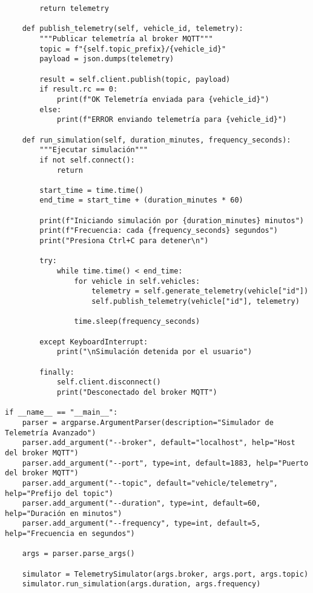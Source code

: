 \begin{verbatim}
        return telemetry
    
    def publish_telemetry(self, vehicle_id, telemetry):
        """Publicar telemetría al broker MQTT"""
        topic = f"{self.topic_prefix}/{vehicle_id}"
        payload = json.dumps(telemetry)
        
        result = self.client.publish(topic, payload)
        if result.rc == 0:
            print(f"OK Telemetría enviada para {vehicle_id}")
        else:
            print(f"ERROR enviando telemetría para {vehicle_id}")
    
    def run_simulation(self, duration_minutes, frequency_seconds):
        """Ejecutar simulación"""
        if not self.connect():
            return
        
        start_time = time.time()
        end_time = start_time + (duration_minutes * 60)
        
        print(f"Iniciando simulación por {duration_minutes} minutos")
        print(f"Frecuencia: cada {frequency_seconds} segundos")
        print("Presiona Ctrl+C para detener\n")
        
        try:
            while time.time() < end_time:
                for vehicle in self.vehicles:
                    telemetry = self.generate_telemetry(vehicle["id"])
                    self.publish_telemetry(vehicle["id"], telemetry)
                
                time.sleep(frequency_seconds)
                
        except KeyboardInterrupt:
            print("\nSimulación detenida por el usuario")
        
        finally:
            self.client.disconnect()
            print("Desconectado del broker MQTT")

if __name__ == "__main__":
    parser = argparse.ArgumentParser(description="Simulador de Telemetría Avanzado")
    parser.add_argument("--broker", default="localhost", help="Host del broker MQTT")
    parser.add_argument("--port", type=int, default=1883, help="Puerto del broker MQTT")
    parser.add_argument("--topic", default="vehicle/telemetry", help="Prefijo del topic")
    parser.add_argument("--duration", type=int, default=60, help="Duración en minutos")
    parser.add_argument("--frequency", type=int, default=5, help="Frecuencia en segundos")
    
    args = parser.parse_args()
    
    simulator = TelemetrySimulator(args.broker, args.port, args.topic)
    simulator.run_simulation(args.duration, args.frequency)
\end{verbatim}

